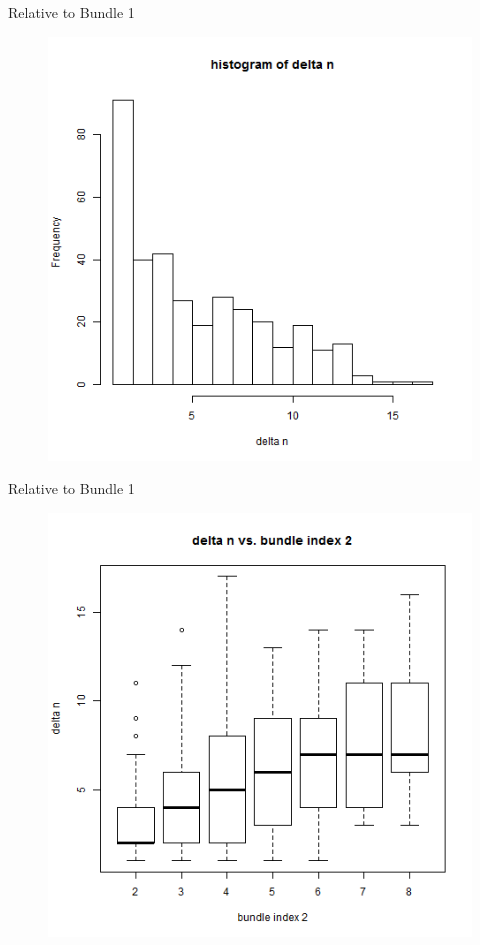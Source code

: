 \documentclass[xcolor=dvipsnames,11pt]{beamer}
\theoremstyle{definition}
\begin{document}
\begin{frame}{Relative to Bundle 1}
\begin{figure}

\includegraphics[scale=0.43]{rel1_1_histogram_of_delta_n}
\end{figure}
\end{frame}

\begin{frame}{Relative to Bundle 1}
\begin{figure}

\includegraphics[scale=0.43]{rel1_2_boxplot_delta_n_bundle_index2}
\end{figure}
\end{frame}
\end{document}
